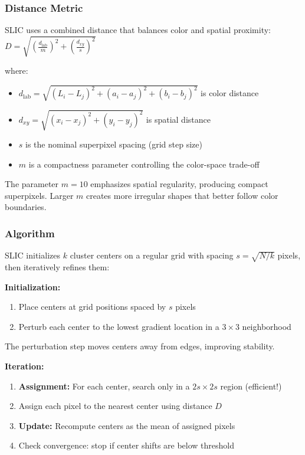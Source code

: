 \documentclass[11pt,a4paper]{article}
\begin{document}
\subsubsection{Distance Metric}
SLIC uses a combined distance that balances color and spatial proximity:
$D = \sqrt{\left(\frac{d_{\text{lab}}}{m}\right)^2 + \left(\frac{d_{xy}}{s}\right)^2}$

where:
\begin{itemize}
    \item $d_{\text{lab}} = \sqrt{(L_i - L_j)^2 + (a_i - a_j)^2 + (b_i - b_j)^2}$ is color distance
    \item $d_{xy} = \sqrt{(x_i - x_j)^2 + (y_i - y_j)^2}$ is spatial distance
    \item $s$ is the nominal superpixel spacing (grid step size)
    \item $m$ is a compactness parameter controlling the color-space trade-off
\end{itemize}

The parameter $m = 10$ emphasizes spatial regularity, producing compact superpixels. Larger $m$ creates more irregular shapes that better follow color boundaries.

\subsubsection{Algorithm}
SLIC initializes $k$ cluster centers on a regular grid with spacing $s = \sqrt{N/k}$ pixels, then iteratively refines them:

\textbf{Initialization:}
\begin{enumerate}
    \item Place centers at grid positions spaced by $s$ pixels
    \item Perturb each center to the lowest gradient location in a $3 \times 3$ neighborhood
\end{enumerate}

The perturbation step moves centers away from edges, improving stability.

\textbf{Iteration:}
\begin{enumerate}
    \item \textbf{Assignment:} For each center, search only in a $2s \times 2s$ region (efficient!)
    \item Assign each pixel to the nearest center using distance $D$
    \item \textbf{Update:} Recompute centers as the mean of assigned pixels
    \item Check convergence: stop if center shifts are below threshold
\end{enumerate}
\end{document}
